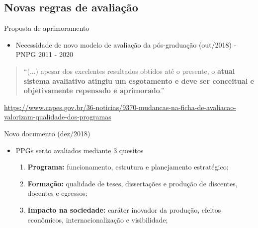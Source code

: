 \subsection{Novas regras de avaliação}

\begin{frame}{Proposta de aprimoramento}
\begin{itemize}
\item Necessidade de novo modelo de avaliação da pós-graduação (out/2018) - PNPG 2011 - 2020
\end{itemize}
\begin{quotation}
``(...) apesar dos excelentes resultados obtidos até o presente, o \textbf{atual sistema avaliativo atingiu um esgotamento e deve ser conceitual e objetivamente repensado e aprimorado}.''
\end{quotation}

\scriptsize{\url{https://www.capes.gov.br/36-noticias/9370-mudancas-na-ficha-de-avaliacao-valorizam-qualidade-dos-programas}}
\end{frame}

\begin{frame}{Novo documento (dez/2018)}
\begin{itemize}
\item PPGs serão avaliados mediante 3 quesitos
\begin{enumerate}
\item \textbf{Programa:} funcionamento, estrutura e planejamento estratégico;
\item \textbf{Formação:} qualidade de teses, dissertações e produção de discentes, docentes e egressos;
\item \textbf{Impacto na sociedade:} caráter inovador da produção, efeitos econômicos, internacionalização e visibilidade;
\end{enumerate}
\end{itemize}
\end{frame}

